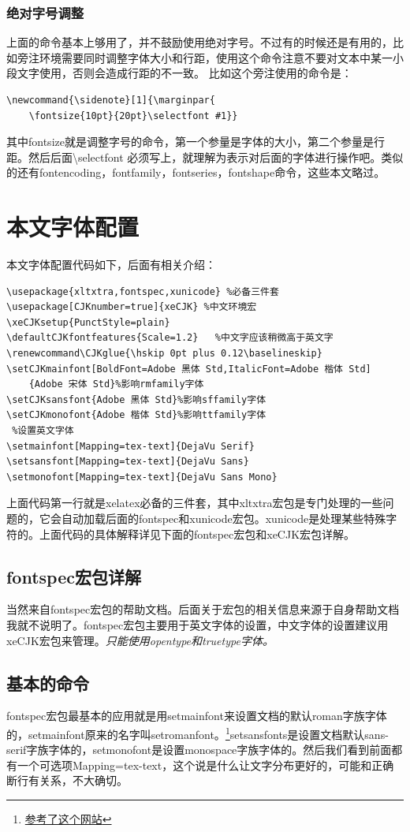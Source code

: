 \documentclass[11pt,oneside]{book}
\begin{document}
\begin{common-format}
\subsubsection{绝对字号调整}
上面的命令基本上够用了，并不鼓励使用绝对字号。不过有的时候还是有用的，比如旁注环境需要同时调整字体大小和行距，使用这个命令注意不要对文本中某一小段文字使用，否则会造成行距的不一致。
比如这个旁注使用的命令是：
\begin{Verbatim}
\newcommand{\sidenote}[1]{\marginpar{  
 	\fontsize{10pt}{20pt}\selectfont #1}}
\end{Verbatim}
其中fontsize就是调整字号的命令，第一个参量是字体的大小，第二个参量是行距。然后后面\textbackslash selectfont 必须写上，就理解为表示对后面的字体进行操作吧。类似的还有fontencoding，fontfamily，fontseries，fontshape命令，这些本文略过。


\section{本文字体配置}
本文字体配置代码如下，后面有相关介绍：
\begin{Verbatim}
\usepackage{xltxtra,fontspec,xunicode} %必备三件套
\usepackage[CJKnumber=true]{xeCJK} %中文环境宏
\xeCJKsetup{PunctStyle=plain}
\defaultCJKfontfeatures{Scale=1.2}   %中文字应该稍微高于英文字
\renewcommand\CJKglue{\hskip 0pt plus 0.12\baselineskip} 
\setCJKmainfont[BoldFont=Adobe 黑体 Std,ItalicFont=Adobe 楷体 Std]
    {Adobe 宋体 Std}%影响rmfamily字体
\setCJKsansfont{Adobe 黑体 Std}%影响sffamily字体
\setCJKmonofont{Adobe 楷体 Std}%影响ttfamily字体
 %设置英文字体
\setmainfont[Mapping=tex-text]{DejaVu Serif} 
\setsansfont[Mapping=tex-text]{DejaVu Sans}
\setmonofont[Mapping=tex-text]{DejaVu Sans Mono}
\end{Verbatim}

上面代码第一行就是xelatex必备的三件套，其中xltxtra宏包是专门处理\XeLaTeX 的一些问题的，它会自动加载后面的fontspec和xunicode宏包。xunicode是处理某些特殊字符的。上面代码的具体解释详见下面的fontspec宏包和xeCJK宏包详解。


\subsection{fontspec宏包详解}
当然来自fontspec宏包的帮助文档。后面关于宏包的相关信息来源于自身帮助文档我就不说明了。fontspec宏包主要用于英文字体的设置，中文字体的设置建议用xeCJK宏包来管理。\emph{\XeLaTeX 只能使用opentype和truetype字体。}

\subsection{基本的命令}
fontspec宏包最基本的应用就是用setmainfont来设置文档的默认roman字族字体的，setmainfont原来的名字叫setromanfont。\footnote{\href{http://tex.stackexchange.com/questions/70413/problem-with-xetex-latex-and-system-fonts}{参考了这个网站}}setsansfonts是设置文档默认sans-serif字族字体的，setmonofont是设置monospace字族字体的。然后我们看到前面都有一个可选项Mapping=tex-text，这个说是什么让\XeTeX 文字分布更好的，可能和正确断行有关系，不大确切。


\end{common-format}
\end{document}

